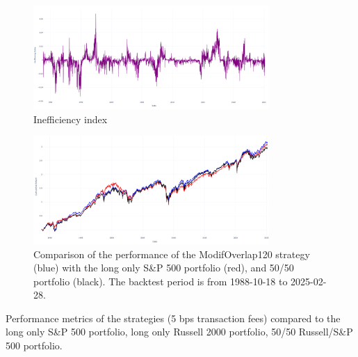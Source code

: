 \documentclass[11pt]{extarticle}
\begin{document}
\begin{figure}[ht]
    \centering
    \includegraphics[width=0.8\textwidth]{img/inefficiency_index.png}
    \caption{Inefficiency index}
    \label{fig:inefficiency_index}
\end{figure}
\FloatBarrier



\begin{figure}[ht]
    \centering
    \includegraphics[width=0.8\textwidth]{img/backtest_long_neutral.png}
    \caption{Comparison of the performance of the ModifOverlap120 strategy (blue) with the long only S\&P 500 portfolio (red),
        and 50/50 portfolio (black).
        The backtest period is from 1988-10-18 to 2025-02-28.}
    \label{fig:cumulative_performance}
\end{figure}

\FloatBarrier

\begin{table}[!h]
    \centering
    \caption{Performance metrics of the strategies (5 bps transaction fees) compared to the long only S\&P 500
    portfolio, long only Russell 2000 portfolio, 50/50 Russell/S\&P 500 portfolio.}
    \label{tab:performance_table}
\end{table}
\end{document}

